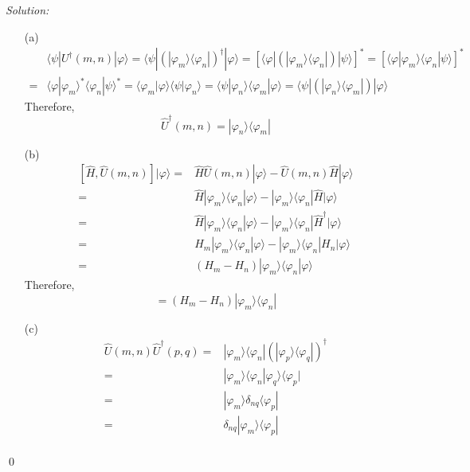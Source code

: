 \documentclass[12pt,a4paper]{article}
\newenvironment{sol}
    {\emph{Solution:}
    }
    {
    \qed
    }
\begin{document}
\begin{sol}
\begin{itemize}
\item[(a)]
\begin{align}
\nonumber&\langle\psi|U^{\dagger}(m,n)|\varphi\rangle=\langle\psi|(|\varphi_m\rangle\langle\varphi_n|)^{\dagger}|\varphi\rangle=[\langle\varphi|(|\varphi_m\rangle\langle\varphi_n|)|\psi\rangle]^*=[\langle\varphi|\varphi_m\rangle\langle\varphi_n|\psi\rangle]^*\\
=&\langle\varphi|\varphi_m\rangle^*\langle\varphi_n|\psi\rangle^*=\langle\varphi_m|\varphi\rangle\langle\psi|\varphi_n\rangle=\langle\psi|\varphi_n\rangle\langle\varphi_m|\varphi\rangle=\langle\psi|(|\varphi_n\rangle\langle\varphi_m|)|\varphi\rangle
\end{align}
Therefore,
\begin{equation}
\hat{U}^{\dagger}(m,n)=|\varphi_n\rangle\langle\varphi_m|
\end{equation}
\item[(b)]
\begin{align}
\nonumber[\hat{H},\hat{U}(m,n)]|\varphi\rangle=&\hat{H}\hat{U}(m,n)|\varphi\rangle-\hat{U}(m,n)\hat{H}|\varphi\rangle\\
\nonumber=&\hat{H}|\varphi_m\rangle\langle\varphi_n|\varphi\rangle-|\varphi_m\rangle\langle\varphi_n|\hat{H}|\varphi\rangle\\
\nonumber=&\hat{H}|\varphi_m\rangle\langle\varphi_n|\varphi\rangle-|\varphi_m\rangle\langle\varphi_n|\hat{H}^{\dagger}|\varphi\rangle\\
\nonumber=&H_m|\varphi_m\rangle\langle\varphi_n|\varphi\rangle-|\varphi_m\rangle\langle\varphi_n|H_n|\varphi\rangle\\
=&(H_m-H_n)|\varphi_m\rangle\langle\varphi_n|\varphi\rangle
\end{align}
Therefore,
\begin{equation}
[\hat{H},\hat{U}(m,n)]=(H_m-H_n)|\varphi_m\rangle\langle\varphi_n|
\end{equation}
\item[(c)]
\begin{align}
\nonumber\hat{U}(m,n)\hat{U}^{\dagger}(p,q)=&|\varphi_m\rangle\langle\varphi_n|(|\varphi_p\rangle\langle\varphi_q|)^{\dagger}\\
\nonumber=&|\varphi_m\rangle\langle\varphi_n|\varphi_q\rangle\langle\varphi_p|\\
\nonumber=&|\varphi_m\rangle\delta_{nq}\langle\varphi_p|\\
\nonumber=&\delta_{nq}|\varphi_m\rangle\langle\varphi_p|\\

\end{align}
\end{itemize}
\end{sol}
\end{document}
